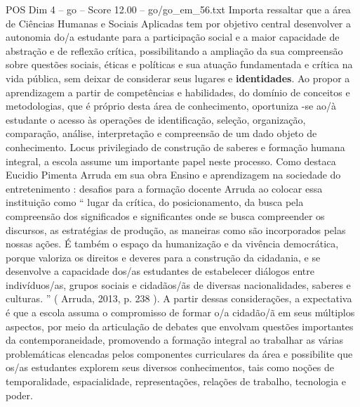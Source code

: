 \begin{textsample}{POS Dim 4 – go – Score 12.00 – go/go\_em\_56.txt}
Importa ressaltar que a área de Ciências Humanas e Sociais Aplicadas tem por objetivo central desenvolver a autonomia do/a estudante para a participação social e a maior capacidade de abstração e de reflexão crítica, possibilitando a ampliação da sua compreensão sobre questões sociais, éticas e políticas e sua atuação fundamentada e crítica na vida pública, sem deixar de considerar seus lugares e \textbf{identidades}.
Ao propor a aprendizagem a partir de competências e habilidades, do domínio de conceitos e metodologias, que é próprio desta área de conhecimento, oportuniza -se ao/à estudante o acesso às operações de identificação, seleção, organização, comparação, análise, interpretação e compreensão de um dado objeto de conhecimento.
Locus privilegiado de construção de saberes e formação humana integral, a escola assume um importante papel neste processo.
Como destaca Eucidio Pimenta Arruda em sua obra Ensino e aprendizagem na sociedade do entretenimento : desafios para a formação docente Arruda ao colocar essa instituição como “ lugar da crítica, do posicionamento, da busca pela compreensão dos significados e significantes onde se busca compreender os discursos, as estratégias de produção, as maneiras como são incorporados pelas nossas ações.
É também o espaço da humanização e da vivência democrática, porque valoriza os direitos e deveres para a construção da cidadania, e se desenvolve a capacidade dos/as estudantes de estabelecer diálogos entre indivíduos/as, grupos sociais e cidadãos/ãs de diversas nacionalidades, saberes e culturas. ” ( Arruda, 2013, p. 238 ).
A partir dessas considerações, a expectativa é que a escola assuma o compromisso de formar o/a cidadão/ã em seus múltiplos aspectos, por meio da articulação de debates que envolvam questões importantes da contemporaneidade, promovendo a formação integral ao trabalhar as várias problemáticas elencadas pelos componentes curriculares da área e possibilite que os/as estudantes explorem seus diversos conhecimentos, tais como noções de temporalidade, espacialidade, representações, relações de trabalho, tecnologia e poder.

\end{textsample}
